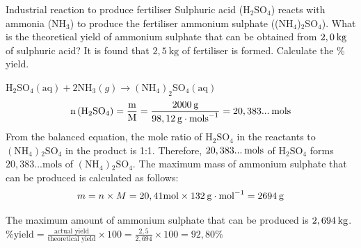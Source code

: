  \par \label{m38712*secfhsst!!!underscore!!!id2067}
      \noindent 
      \begin{wex}{Industrial reaction to produce fertiliser }
{
\label{m38712*probfhsst!!!underscore!!!id2068}
      \label{m38712*id284606}Sulphuric acid ($\text{H}{}_{2}\text{SO}{}_{4}$) reacts with ammonia ($\text{NH}{}_{3}$) to produce the fertiliser ammonium sulphate (($\text{NH}{}_{4}$)${}_{2}\text{SO}{}_{4}$). What is the theoretical yield of ammonium sulphate that can be obtained from $2,0\phantom{\rule{2pt}{0ex}}\text{kg}$ of sulphuric acid? It is found that $2,5 ~\text{kg}$ of fertiliser is formed. Calculate the \% yield. }
{
      \label{m38712*id284813}\nopagebreak\noindent{}
\label{m38712*id284690}${\text{H}}_{2}{\text{SO}}_{4}\left(\text{aq}\right)+2{\text{NH}}_{3}\left(g\right)\to {\left({\text{NH}}_{4}\right)}_{2}{\text{SO}}_{4}\left(\text{aq}\right)$
    \begin{equation*}
    \text{n}\left({\text{H}}_{2}{\text{SO}}_{4}\right)=\frac{\text{m}}{\text{M}}=\frac{2 000\phantom{\rule{2pt}{0ex}}\text{g}}{98,12\phantom{\rule{2pt}{0ex}}\text{g}\ensuremath{\cdot}{\text{mols}}^{-1}}=20,383...\phantom{\rule{2pt}{0ex}}\text{mols}
      \end{equation*}
      \label{m38712*id285156}From the balanced equation, the mole ratio of $\text{H}{}_{2}\text{SO}{}_{4}$ in the reactants to $\left(\text{NH}{}_{4}\right){}_{2}\text{SO}{}_{4}$ in the product is 1:1. Therefore, $20,383...\phantom{\rule{2pt}{0ex}}\text{mols}$ of $\text{H}{}_{2}\text{SO}{}_{4}$ forms $20,383... \text{mols}$ of $\left(\text{NH}{}_{4}\right){}_{2}\text{SO}{}_{4}$. 
      \label{m38712*id285290}The maximum mass of ammonium sulphate that can be produced is calculated as follows:
      \label{m38712*id285296}\nopagebreak\noindent{}
    \begin{equation*}
    m=n\ensuremath{\times}M=20,41\text{mol}\ensuremath{\times}132\phantom{\rule{2pt}{0ex}}\text{g}\ensuremath{\cdot}{\text{mol}}^{-1}=2694\phantom{\rule{2pt}{0ex}}\text{g}
      \end{equation*}
      
      \label{m38712*id285362}The maximum amount of ammonium sulphate that can be produced is $2,694\phantom{\rule{2pt}{0ex}}\text{kg}$.
 $\text{\% yield} = \frac{\text{actual yield}}{\text{theoretical yield}} \times 100 = \frac{2,5}{2,694} \times 100 = 92,80 \%$
}
    \end{wex}
